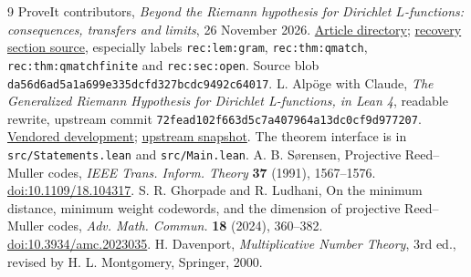 \documentclass[11pt]{article}
\theoremstyle{remark}\newtheorem{remark}[theorem]{Remark}
\begin{document}
\begin{thebibliography}{9}
 ProveIt contributors, \emph{Beyond the Riemann hypothesis for Dirichlet $L$-functions: consequences, transfers and limits}, 26 November 2026. \href{https://github.com/VladimirReshetnikov/ProveIt/tree/main/Analysis/GeneralizedRiemannHypothesis/Article}{Article directory}; \href{https://github.com/VladimirReshetnikov/ProveIt/blob/main/Analysis/GeneralizedRiemannHypothesis/Article/sections/rec.tex}{recovery section source}, especially labels \texttt{rec:lem:gram}, \texttt{rec:thm:qmatch}, \texttt{rec:thm:qmatchfinite} and \texttt{rec:sec:open}. Source blob \texttt{da56d6ad5a1a699e335dcfd327bcdc9492c64017}.
 L. Alp\"oge with Claude, \emph{The Generalized Riemann Hypothesis for Dirichlet L-functions, in Lean 4}, readable rewrite, upstream commit \texttt{72fead102f663d5c7a407964a13dc0cf9d977207}. \href{https://github.com/VladimirReshetnikov/ProveIt/tree/main/Analysis/GeneralizedRiemannHypothesis/vendor/grh-lean}{Vendored development}; \href{https://github.com/lsernau/grh-lean/tree/72fead102f663d5c7a407964a13dc0cf9d977207/grh}{upstream snapshot}. The theorem interface is in \texttt{src/Statements.lean} and \texttt{src/Main.lean}.
 A. B. S\o rensen, Projective Reed--Muller codes, \emph{IEEE Trans. Inform. Theory} \textbf{37} (1991), 1567--1576. \href{https://doi.org/10.1109/18.104317}{doi:10.1109/18.104317}.
 S. R. Ghorpade and R. Ludhani, On the minimum distance, minimum weight codewords, and the dimension of projective Reed--Muller codes, \emph{Adv. Math. Commun.} \textbf{18} (2024), 360--382. \href{https://doi.org/10.3934/amc.2023035}{doi:10.3934/amc.2023035}.
 H. Davenport, \emph{Multiplicative Number Theory}, 3rd ed., revised by H. L. Montgomery, Springer, 2000.
\end{thebibliography}
\end{document}
